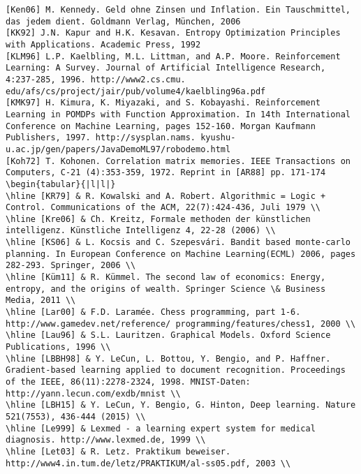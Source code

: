 \documentclass[10pt]{article}
\begin{document}
\begin{verbatim}
[Ken06] M. Kennedy. Geld ohne Zinsen und Inflation. Ein Tauschmittel, das jedem dient. Goldmann Verlag, München, 2006
[KK92] J.N. Kapur and H.K. Kesavan. Entropy Optimization Principles with Applications. Academic Press, 1992
[KLM96] L.P. Kaelbling, M.L. Littman, and A.P. Moore. Reinforcement Learning: A Survey. Journal of Artificial Intelligence Research, 4:237-285, 1996. http://www2.cs.cmu. edu/afs/cs/project/jair/pub/volume4/kaelbling96a.pdf
[KMK97] H. Kimura, K. Miyazaki, and S. Kobayashi. Reinforcement Learning in POMDPs with Function Approximation. In 14th International Conference on Machine Learning, pages 152-160. Morgan Kaufmann Publishers, 1997. http://sysplan.nams. kyushu-u.ac.jp/gen/papers/JavaDemoML97/robodemo.html
[Koh72] T. Kohonen. Correlation matrix memories. IEEE Transactions on Computers, C-21 (4):353-359, 1972. Reprint in [AR88] pp. 171-174
\begin{tabular}{|l|l|}
\hline [KR79] & R. Kowalski and A. Robert. Algorithmic = Logic + Control. Communications of the ACM, 22(7):424-436, Juli 1979 \\
\hline [Kre06] & Ch. Kreitz, Formale methoden der künstlichen intelligenz. Künstliche Intelligenz 4, 22-28 (2006) \\
\hline [KS06] & L. Kocsis and C. Szepesvári. Bandit based monte-carlo planning. In European Conference on Machine Learning(ECML) 2006, pages 282-293. Springer, 2006 \\
\hline [Küm11] & R. Kümmel. The second law of economics: Energy, entropy, and the origins of wealth. Springer Science \& Business Media, 2011 \\
\hline [Lar00] & F.D. Laramée. Chess programming, part 1-6. http://www.gamedev.net/reference/ programming/features/chess1, 2000 \\
\hline [Lau96] & S.L. Lauritzen. Graphical Models. Oxford Science Publications, 1996 \\
\hline [LBBH98] & Y. LeCun, L. Bottou, Y. Bengio, and P. Haffner. Gradient-based learning applied to document recognition. Proceedings of the IEEE, 86(11):2278-2324, 1998. MNIST-Daten: http://yann.lecun.com/exdb/mnist \\
\hline [LBH15] & Y. LeCun, Y. Bengio, G. Hinton, Deep learning. Nature 521(7553), 436-444 (2015) \\
\hline [Le999] & Lexmed - a learning expert system for medical diagnosis. http://www.lexmed.de, 1999 \\
\hline [Let03] & R. Letz. Praktikum beweiser. http://www4.in.tum.de/letz/PRAKTIKUM/al-ss05.pdf, 2003 \\

\end{verbatim}
\end{document}
